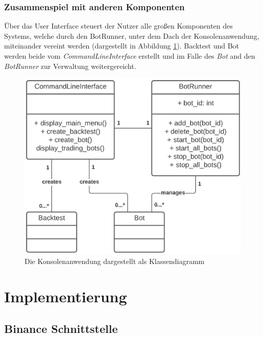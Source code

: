 \documentclass[oneside]{ausarbeitung}
\begin{document}
\subsection{Zusammenspiel mit anderen Komponenten}
\label{sub:zusammenspiel_mit_anderen_komponenten}


Über das User Interface steuert der Nutzer alle großen Komponenten des Systems, welche durch den BotRunner, unter dem Dach der Konsolenanwendung, miteinander vereint werden (dargestellt in Abbildung \ref{fig:15}). Backtest und Bot werden beide vom \textit{CommandLineInterface} erstellt und im Falle des \textit{Bot} and den \textit{BotRunner} zur Verwaltung weitergereicht.

\begin{figure}[H]
  \centering
  \includegraphics[height=0.42\textheight]{uml/cli_uml.png}
  \caption{Die Konsolenanwendung dargestellt als Klassendiagramm}
  \label{fig:15}
\end{figure}

\chapter{Implementierung}
\label{cha:implementierung}


\section{Binance Schnittstelle}
\label{sec:binance_schnittstelle}
\end{document}
